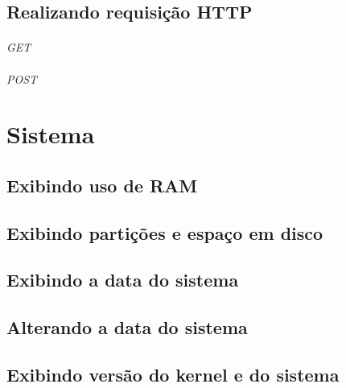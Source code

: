 \documentclass[a4paper,9pt]{extarticle}
\begin{document}
\begin{multicols}{2}
	
\subsection{Realizando requisição HTTP}
	
	\paragraph{} \emph{GET} 
	
	\paragraph{} \emph{POST} 
	
\section{Sistema}
\subsection{Exibindo uso de RAM}
	
	
\subsection{Exibindo partições e espaço em disco}
	

\subsection{Exibindo a data do sistema}
	
	
\subsection{Alterando a data do sistema}
	
	
\subsection{Exibindo versão do kernel e do sistema}
	

\end{multicols}
\end{document}
